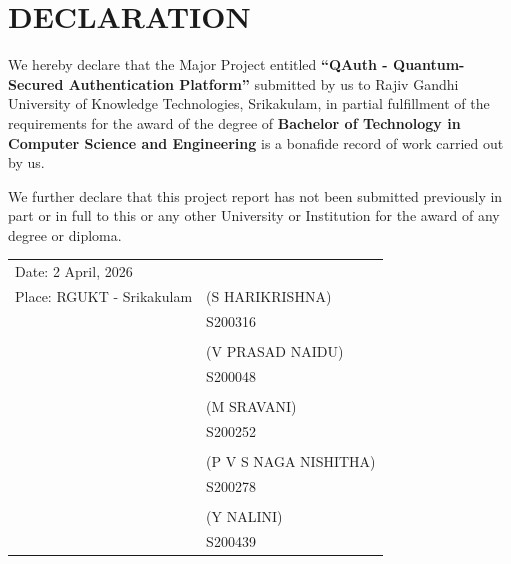 \documentclass[12pt,a4paper]{report}
\begin{document}
\chapter*{\centering DECLARATION}

\noindent We hereby declare that the Major Project entitled \textbf{``QAuth - Quantum-Secured Authentication Platform''}
submitted by us to Rajiv Gandhi University of Knowledge Technologies,
Srikakulam, in partial fulfillment of the requirements for the award of the
degree of \textbf{Bachelor of Technology in Computer Science and Engineering}
is a bonafide record of work carried out by us.

\vspace{0.3cm}

We further declare that this project report has not been submitted previously
in part or in full to this or any other University or Institution for the award
of any degree or diploma.

\vspace{2cm}

\noindent\begin{tabular}{p{8cm} p{6cm}}

Date: 2 April, 2026 & \hfill   \\  %
Place: RGUKT - Srikakulam & \hfill (S HARIKRISHNA)\\
& \hfill S200316 \\[0.6cm]

 & \hfill   \\
 & \hfill (V PRASAD NAIDU)\\
 & \hfill S200048 \\[0.6cm]

 & \hfill   \\
 & \hfill (M SRAVANI)\\
 & \hfill S200252 \\[0.6cm]

 & \hfill    \\
  & \hfill (P V S NAGA NISHITHA)\\
 & \hfill S200278 \\

 & \hfill    \\
  & \hfill (Y NALINI)\\
 & \hfill S200439 \\

\end{tabular}
\end{document}

